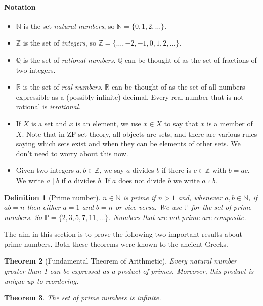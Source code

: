 \documentclass{article}
\theoremstyle{plain}
\newtheorem{theorem}{Theorem}[section]{\bfseries}{\itshape}
\newtheorem{definition}[theorem]{Definition}{\bfseries}{\upshape}
\newcommand{\bN}{\mathbb{N}}
\newcommand{\bZ}{\mathbb{Z}}
\newcommand{\bQ}{\mathbb{Q}}
\newcommand{\bR}{\mathbb{R}}
\newcommand{\bP}{\mathbb{P}}
\newcommand*{\prefix}{}
\begin{document}
\paragraph{Notation}
\begin{itemize}
\item $\bN$ is the set \emph{natural numbers}, so $\bN=\{0,1,2,\ldots\}$.
\item $\bZ$ is the set of \emph{integers}, so $\bZ=\{\ldots,-2,-1,0,1,2,\ldots\}$.
\item $\bQ$ is the set of \emph{rational numbers}. $\bQ$ can be thought of as the set of fractions of two integers.
\item $\bR$ is the set of \emph{real numbers}. $\bR$ can be thought of as the set of all numbers expressible as a (possibly infinite) decimal. Every real number that is not rational is \emph{irrational}.
\item If $X$ is a set and $x$ is an element, we use $x\in X$ to say that $x$ is a member of $X$. Note that in ZF set theory, all objects are sets, and there are various rules saying which sets exist and when they can be elements of other sets. We don't need to worry about this now.
\item Given two integers $a,b\in \bZ$, we say $a$ divides $b$ if there is $c\in \bZ$ with $b=ac$. We write $a\mid b$ if $a$ divides $b$. If $a$ does not divide $b$ we write $a\nmid b$.
\end{itemize}
\begin{definition}[Prime number]
$n\in \bN$ is \emph{prime} if $n>1$ and, whenever $a,b\in \bN$, if $ab=n$ then either $a=1$ and $b= n$ or vice-versa. We use $\bP$ for the set of prime numbers. So $\bP=\{2,3,5,7,11,\ldots\}$.  Numbers that are not prime are \emph{composite}.
\end{definition}

The aim in this section is to prove the following two important results about prime numbers. Both these theorems were known to the ancient Greeks.

\begin{theorem}[Fundamental Theorem of Arithmetic]\label{\prefix \prefix T:fund}
Every natural number greater than 1 can be expressed as a product of primes. Moreover, this product is unique up to reordering.
\end{theorem}

\begin{theorem}\label{\prefix T:inf}
The set of prime numbers is infinite.
\end{theorem}
\end{document}
